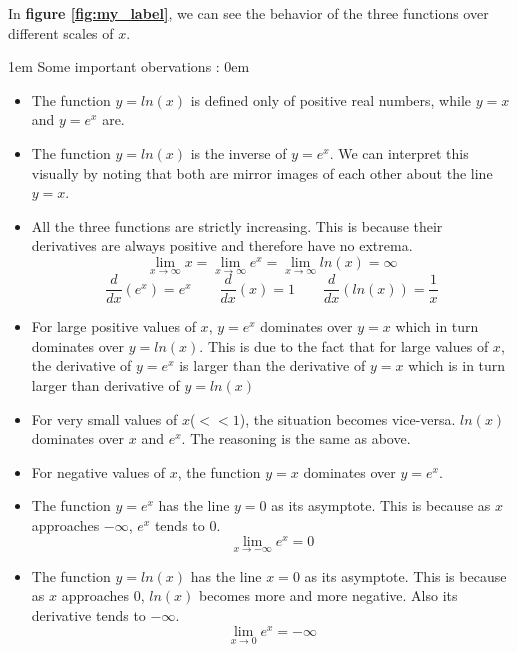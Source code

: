\documentclass[12]{article}
\begin{document}
    In \textbf{figure \ref{fig:my_label}}, we can see the behavior of the three functions over different scales of $x$.
    
   \parskip 1em
    Some important obervations :
    \parskip 0em
    \begin{itemize}
        \item The function $y = ln(x)$ is defined only of positive real numbers, while $y = x$ and $y=e^x$ are.
        \item The function $y = ln(x)$ is the inverse of $y = e^x$. We can interpret this visually by noting that both are mirror images of each other about the line $y = x$.
        \item All the three functions are strictly increasing. This is because their derivatives are always positive and therefore have no extrema.
            \begin{equation}
                \lim_{x\to\infty} x = \lim_{x\to\infty} e^x = \lim_{x\to\infty} ln(x) = \infty
            \end{equation}
            \begin{equation}
                \frac{d}{dx}(e^x) = e^x\qquad\frac{d}{dx}(x) = 1\qquad\frac{d}{dx}(ln(x)) = \frac{1}{x}
            \end{equation}
        \item For large positive values of $x$, $y = e^x$ dominates over $y = x$ which in turn dominates over $y = ln(x)$. This is due to the fact that for large values of $x$, the derivative of $y = e^x$ is larger than the derivative of $y = x$ which is in turn larger than derivative of $y = ln(x)$
        \item For very small values of $x$($<<1$), the situation becomes vice-versa. $ln(x)$ dominates over $x$ and $e^x$. The reasoning is the same as above.
        \item For negative values of $x$, the function $y = x$ dominates over $y = e^x$.
        \item The function $y = e^x$ has the line $y = 0$ as its asymptote. This is because as $x$ approaches $-\infty$, $e^x$ tends to $0$.
            \begin{equation}
                \lim_{x\to-\infty} e^x = 0
            \end{equation}
        \item The function $y = ln(x)$ has the line $x = 0$ as its asymptote. This is because as $x$ approaches 0, $ln(x)$ becomes more and more negative. Also its derivative tends to $-\infty$.
            \begin{equation}
                \lim_{x\to0} e^x = -\infty
            \end{equation}
    \end{itemize}
    
\end{document}
